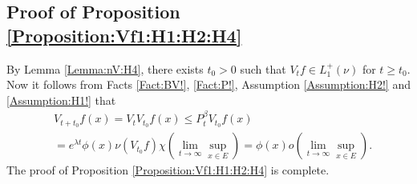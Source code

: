 \documentclass[12pt,a4paper]{amsart}
\numberwithin{equation}{section}
\theoremstyle{plain}
\theoremstyle{definition}
\theoremstyle{remark}
\begin{document}
\subsection{Proof of Proposition \ref{Proposition:Vf1:H1:H2:H4}}
By Lemma \ref{Lemma:nV:H4}, there exists $t_0>0$ such that $V_tf \in L_1^+(\nu)$ for $t\geq t_0$.
Now it follows from Facts \ref{Fact:BV!}, \ref{Fact:P!}, Assumption \ref{Assumption:H2!} and \ref{Assumption:H1!} that
\begin{align}
 &V_{t+t_0}f (x)
 = V_tV_{t_0}f(x)
 \leq P_t^\beta V_{t_0} f(x)
 \\&= e^{\lambda t}\phi(x) \nu( V_{t_0} f) \chi(\lim_{t\to \infty} \sup_{x\in E})
 = \phi(x) o(\lim_{t\to \infty}\sup_{x\in E}).
 \end{align}
The proof of Proposition \ref{Proposition:Vf1:H1:H2:H4} is complete.
\end{document}
